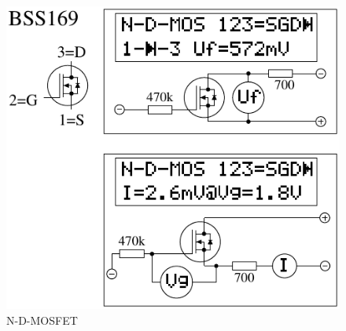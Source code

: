 \begin{figure}[H]
\centering
\includegraphics[width=.8\textwidth]{../FIG/MOS_BSS169.pdf}
\caption{N-D-MOSFET}
\label{fig:MOS-N-D}
\end{figure}

